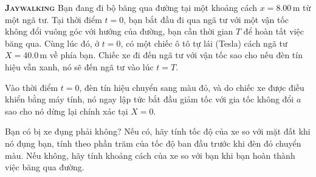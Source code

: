 \begin{problem}

{\textbf{\textsc{Jaywalking}}} 
Bạn đang đi bộ băng qua đường tại một khoảng cách \( x = 8.00 \, \text{m} \) từ một ngã tư. Tại thời điểm \( t = 0 \), bạn bắt đầu đi qua ngã tư với một vận tốc không đổi vuông góc với hướng của đường, bạn cần thời gian \( T \) để hoàn tất việc băng qua. Cùng lúc đó, ở \( t = 0 \), có một chiếc ô tô tự lái (Tesla) cách ngã tư \( X = 40.0 \, \text{m} \) về phía bạn. Chiếc xe đi đến ngã tư với vận tốc sao cho nếu đèn tín hiệu vẫn xanh, nó sẽ đến ngã tư vào lúc \( t = T \).

Vào thời điểm \( t = 0 \), đèn tín hiệu chuyển sang màu đỏ, và do chiếc xe được điều khiển bằng máy tính, nó ngay lập tức bắt đầu giảm tốc với gia tốc không đổi \( a \) sao cho nó dừng lại chính xác tại \( X = 0 \).

Bạn có bị xe đụng phải không? Nếu có, hãy tính tốc độ của xe so với mặt đất khi nó đụng bạn, tính theo phần trăm của tốc độ ban đầu trước khi đèn đỏ chuyển màu. Nếu không, hãy tính khoảng cách của xe so với bạn khi bạn hoàn thành việc băng qua đường.

\end{problem}